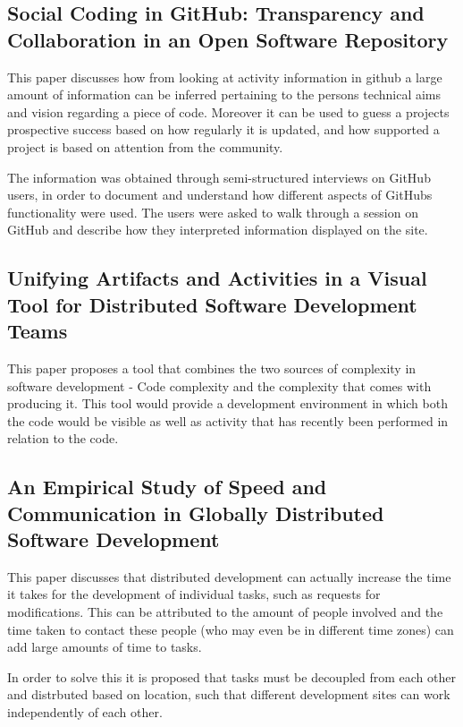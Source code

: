 \documentclass{l4proj}
\begin{document}
\subsection {Social Coding in GitHub: Transparency and Collaboration in an Open Software Repository}

This paper discusses how from looking at activity information in github a large amount of information can be inferred pertaining to the persons technical aims and vision regarding a piece of code.  Moreover it can be used to guess a projects prospective success based on how regularly it is updated, and how supported a project is based on attention from the community.

The information was obtained through semi-structured interviews on GitHub users, in order to document and understand how different aspects of GitHubs functionality were used.  The users were asked to walk through a session on GitHub and describe how they interpreted information displayed on the site.



\subsection {Unifying Artifacts and Activities in a Visual Tool for Distributed Software Development Teams}

This paper proposes a tool that combines the two sources of complexity in software development - Code complexity and the complexity that comes with producing it.  This tool would provide a development environment in which both the code would be visible as well as activity that has recently been performed in relation to the code.



\subsection {An Empirical Study of Speed and Communication in Globally Distributed Software Development}

This paper discusses that distributed development can actually increase the time it takes for the development of individual tasks, such as requests for modifications.  This can be attributed to the amount of people involved and the time taken to contact these people (who may even be in different time zones) can add large amounts of time to tasks.  

In order to solve this it is proposed that tasks must be decoupled from each other and distrbuted based on location, such that different development sites can work independently of each other.
\end{document}
